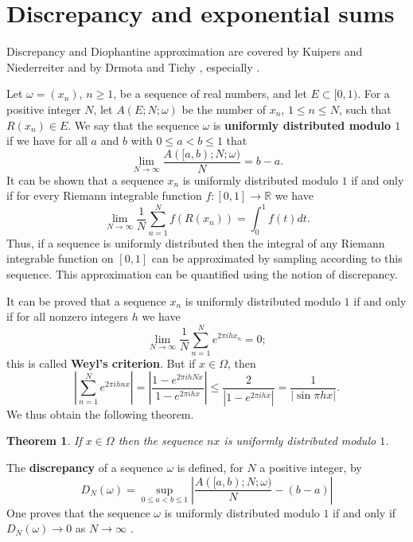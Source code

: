 \documentclass{amsart}
\newtheorem{theorem}{Theorem}
\begin{document}
\section{Discrepancy and exponential sums}
\label{discrepancy}
Discrepancy and Diophantine approximation are covered by Kuipers and Niederreiter \cite[Chapters 1--2 ]{kuipers} and by 
Drmota and Tichy \cite[\S\S 1.1--1.4]{drmota}, especially \cite[pp.~48--66, \S 1.4.1]{drmota}.

Let $\omega=(x_n)$, $n \geq 1$, be a sequence of real numbers, and let $E \subset [0,1)$. For a positive integer $N$, let
$A(E;N;\omega)$ be the number of $x_n$, $1 \leq n \leq N$, such that $R(x_n) \in E$. 
We say that the sequence $\omega$ is \textbf{uniformly distributed modulo $1$} if we have for all $a$ and $b$ with $0 \leq a < b \leq 1$ that 
\[
\lim_{N \to \infty} \frac{A([a,b);N;\omega)}{N}=b-a.
\]
It can be shown \cite[p. 3, Corollary 1.1]{kuipers} that a sequence $x_n$ is uniformly distributed modulo $1$ if and only if for every 
Riemann integrable function $f:[0,1] \to \mathbb{R}$ we have 
\begin{equation}
\lim_{N \to \infty} \frac{1}{N} \sum_{n=1}^N f(R(x_n))= \int_0^1 f(t) dt.
\label{riemann}
\end{equation}
Thus, if a sequence is uniformly distributed then the integral of any Riemann integrable function on $[0,1]$ can be approximated by sampling according to this sequence.
This approximation can be quantified using the notion of discrepancy.

It can be proved \cite[p.~7, Theorem 2.1]{kuipers} that a sequence $x_n$ is uniformly distributed modulo $1$ if and only if 
for all nonzero integers $h$ we have
\[
\lim_{N \to \infty} \frac{1}{N} \sum_{n=1}^N e^{2\pi ihx_n}=0;
\]
this is called \textbf{Weyl's criterion}.
But if $x \in \Omega$, then
\begin{equation}
\left| \sum_{n=1}^N e^{2\pi i hnx} \right| = \left| \frac{1-e^{2\pi i hNx}}{1-e^{2\pi ihx}} \right|
\leq \frac{2}{|1-e^{2\pi ihx}|}=\frac{1}{|\sin \pi h x|}.
\label{irratunif}
\end{equation}
We thus obtain the following theorem.

\begin{theorem}
If $x \in \Omega$ then the sequence $nx$ is uniformly distributed modulo $1$.
\label{uniformtheorem}
\end{theorem}

The \textbf{discrepancy} of a sequence $\omega$ is defined, for $N$ a positive integer, by
\[
D_N(\omega)=\sup_{0 \leq a<b \leq 1} \left| \frac{A([a,b);N;\omega)}{N}-(b-a)\right|
\]
One proves that the sequence $\omega$ is uniformly distributed modulo $1$ if and only if
$D_N(\omega) \to 0$ as $N \to \infty$ \cite[p.~89, Theorem 1.1]{kuipers}.
\end{document}
